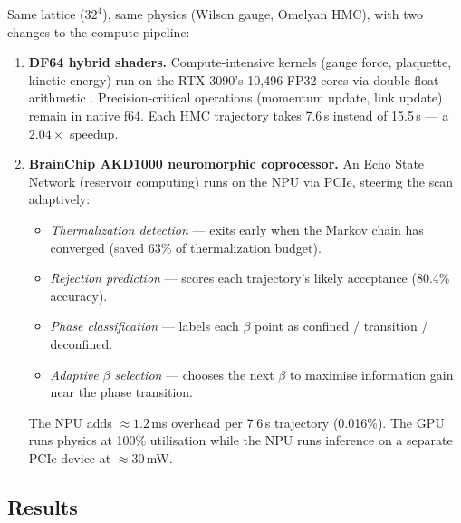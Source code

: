 \documentclass[11pt,a4paper]{article}
\begin{document}
Same lattice ($32^4$), same physics (Wilson gauge, Omelyan HMC), with two
changes to the compute pipeline:

\begin{enumerate}
  \item \textbf{DF64 hybrid shaders.}  Compute-intensive kernels (gauge force,
        plaquette, kinetic energy) run on the RTX 3090's 10,496 FP32 cores via
        double-float arithmetic \cite{Dekker1971}.  Precision-critical
        operations (momentum update, link update) remain in native f64.  Each
        HMC trajectory takes 7.6\,s instead of 15.5\,s --- a $2.04\times$
        speedup.

  \item \textbf{BrainChip AKD1000 neuromorphic coprocessor.}  An Echo State
        Network (reservoir computing) runs on the NPU via PCIe, steering the
        scan adaptively:
        \begin{itemize}
          \item \emph{Thermalization detection} --- exits early when the Markov
                chain has converged (saved 63\% of thermalization budget).
          \item \emph{Rejection prediction} --- scores each trajectory's likely
                acceptance (80.4\% accuracy).
          \item \emph{Phase classification} --- labels each $\beta$ point as
                confined / transition / deconfined.
          \item \emph{Adaptive $\beta$ selection} --- chooses the next $\beta$
                to maximise information gain near the phase transition.
        \end{itemize}
        The NPU adds $\approx 1.2$\,ms overhead per 7.6\,s trajectory
        (0.016\%).  The GPU runs physics at 100\% utilisation while the NPU
        runs inference on a separate PCIe device at $\approx 30$\,mW.
\end{enumerate}

\subsection{Results}
\end{document}
